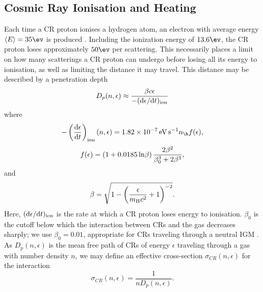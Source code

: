 \subsection{Cosmic Ray Ionisation and Heating}
\label{CRchem}

Each time a CR proton ionises a hydrogen atom, an electron with average energy $\langle E \rangle = 35\ev$ is produced \citep{SpitzerTomasko1968}.  
Including the ionization energy of $13.6\ev$, the CR proton loses approximately $50\ev$ per scattering. 
This necessarily places a limit on how many scatterings a CR proton can undergo before losing all its energy to ionisation, as well as limiting the distance it may travel.  
This distance may be described by a penetration depth 
\begin{equation}
    D_p(n, \epsilon) \approx \frac{\beta c \epsilon} {-({\rm d}\epsilon / {\rm d}t)_{\rm ion}}
\end{equation}
where \citep{Schlickeiser2002}
\begin{equation}
    - \left( \frac{{\rm d}\epsilon} {{\rm d}t} \right)_{\rm ion}(n, \epsilon)
    = 1.82\times10^{-7}\,{\rm \small eV\,s}^{-1} n_{\h} f(\epsilon),
\end{equation}
\begin{equation}    
    f(\epsilon) = (1 + 0.0185 \,{\rm ln}\beta )\, \frac{2 \beta^2}{\beta_0^3 + 2 \beta^3},
\end{equation}
and 
\begin{equation}
    \beta =  \sqrt{1 - \left( \frac{\epsilon}{m_{\rm \tiny H}c^2}+1 \right)^{-2}}.
\end{equation}
Here, $({\rm d}\epsilon / {\rm d}t)_{\rm ion}$ is the rate at which a CR proton loses energy to ionisation. 
$\beta_0$ is the cutoff below which the interaction between CRs and the gas decreases sharply; we use $\beta_0=0.01$, appropriate for CRs traveling through a neutral IGM \citep{StacyBromm2007}.
As $D_p(n, \epsilon)$ is the mean free path of CRs of energy $\epsilon$ traveling through a gas with number density $n$, we may define an effective cross-section $\sigma_{CR}(n,\epsilon)$ for the interaction
\begin{equation}
\sigma_{CR}(n,\epsilon) = \frac{1}{n D_p(n, \epsilon)}.
\end{equation}

